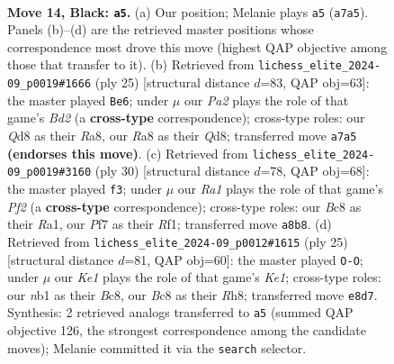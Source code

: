 \documentclass[11pt]{article}
\begin{document}
\clearpage

\begin{figure}[p]\centering
\begin{subfigure}{0.46\textwidth}\centering
\resizebox{\linewidth}{!}{%
\newchessgame
\chessboard[
  setfen={r1bqkb1r/p4ppp/1pn5/4P3/3p3P/1Q3N2/PP3PP1/RNB2RK1 b q - 1 14},
  showmover=false,
  pgfstyle=straightmove, color=movearrow, markmove={a7-a5}
]}
\caption{}
\end{subfigure}\hfill
\begin{subfigure}{0.46\textwidth}\centering
\resizebox{\linewidth}{!}{%
\newchessgame
\chessboard[
  setfen={r2qkb1r/3b1ppp/p2p1n2/4p3/2Q1P3/2N2N2/PP3PPP/R1B2RK1 b kq - 4 13},
  showmover=false,
  pgfstyle=straightmove, color=movearrow, markmove={d7-e6}
]}
\caption{}
\end{subfigure}
\\[4pt]
\begin{subfigure}{0.46\textwidth}\centering
\resizebox{\linewidth}{!}{%
\newchessgame
\chessboard[
  setfen={r3r1k1/p4ppp/1pnq1n2/3p4/3P4/PP1Q4/4NPPP/R1B2RK1 w - - 1 16},
  showmover=false,
  pgfstyle=straightmove, color=movearrow, markmove={f2-f3}
]}
\caption{}
\end{subfigure}\hfill
\begin{subfigure}{0.46\textwidth}\centering
\resizebox{\linewidth}{!}{%
\newchessgame
\chessboard[
  setfen={r1bqk2r/pp2bpp1/2n1p2p/4P3/2BpN3/5N2/PP3PPP/R1Q1R1K1 b kq - 6 13},
  showmover=false,
  pgfstyle=straightmove, color=movearrow, markmove={e8-g8}
]}
\caption{}
\end{subfigure}
\caption{\textbf{Move 14, Black: \texttt{a5}.} (a) Our position; Melanie plays \texttt{a5} (\texttt{a7a5}). Panels (b)--(d) are the retrieved master positions whose correspondence most drove this move (highest QAP objective among those that transfer to it). (b) Retrieved from \texttt{lichess\_elite\_2024-09\_p0019\#1666} (ply 25) [structural distance $d$=83, QAP obj=63]: the master played \texttt{Be6}; under $\mu$ our \emph{Pa2} plays the role of that game's \emph{Bd2} (a \textbf{cross-type} correspondence); cross-type roles: our \emph{Q}d8 as their \emph{R}a8, our \emph{R}a8 as their \emph{Q}d8; transferred move \texttt{a7a5} \textbf{(endorses this move)}. (c) Retrieved from \texttt{lichess\_elite\_2024-09\_p0019\#3160} (ply 30) [structural distance $d$=78, QAP obj=68]: the master played \texttt{f3}; under $\mu$ our \emph{Ra1} plays the role of that game's \emph{Pf2} (a \textbf{cross-type} correspondence); cross-type roles: our \emph{B}c8 as their \emph{R}a1, our \emph{P}f7 as their \emph{R}f1; transferred move \texttt{a8b8}. (d) Retrieved from \texttt{lichess\_elite\_2024-09\_p0012\#1615} (ply 25) [structural distance $d$=81, QAP obj=60]: the master played \texttt{O-O}; under $\mu$ our \emph{Ke1} plays the role of that game's \emph{Ke1}; cross-type roles: our \emph{n}b1 as their \emph{B}c8, our \emph{B}c8 as their \emph{R}h8; transferred move \texttt{e8d7}. Synthesis: 2 retrieved analogs transferred to \texttt{a5} (summed QAP objective 126, the strongest correspondence among the candidate moves); Melanie committed it via the \texttt{search} selector.}
\label{fig:thought-m27}
\end{figure}
\end{document}
